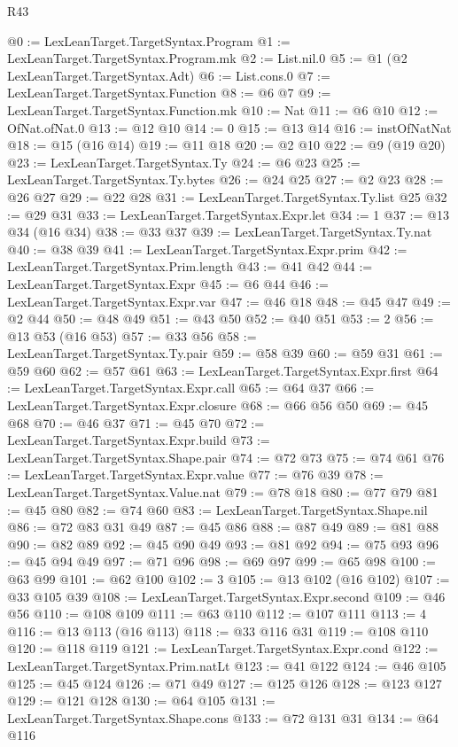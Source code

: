 \begin{lexlean}{R43}
\begin{coremodule}
@0 := LexLeanTarget.TargetSyntax.Program
@1 := LexLeanTarget.TargetSyntax.Program.mk
@2 := List.nil.{0}
@5 := @1 (@2 LexLeanTarget.TargetSyntax.Adt)
@6 := List.cons.{0}
@7 := LexLeanTarget.TargetSyntax.Function
@8 := @6 @7
@9 := LexLeanTarget.TargetSyntax.Function.mk
@10 := Nat
@11 := @6 @10
@12 := OfNat.ofNat.{0}
@13 := @12 @10
@14 := 0
@15 := @13 @14
@16 := instOfNatNat
@18 := @15 (@16 @14)
@19 := @11 @18
@20 := @2 @10
@22 := @9 (@19 @20)
@23 := LexLeanTarget.TargetSyntax.Ty
@24 := @6 @23
@25 := LexLeanTarget.TargetSyntax.Ty.bytes
@26 := @24 @25
@27 := @2 @23
@28 := @26 @27
@29 := @22 @28
@31 := LexLeanTarget.TargetSyntax.Ty.list @25
@32 := @29 @31
@33 := LexLeanTarget.TargetSyntax.Expr.let
@34 := 1
@37 := @13 @34 (@16 @34)
@38 := @33 @37
@39 := LexLeanTarget.TargetSyntax.Ty.nat
@40 := @38 @39
@41 := LexLeanTarget.TargetSyntax.Expr.prim
@42 := LexLeanTarget.TargetSyntax.Prim.length
@43 := @41 @42
@44 := LexLeanTarget.TargetSyntax.Expr
@45 := @6 @44
@46 := LexLeanTarget.TargetSyntax.Expr.var
@47 := @46 @18
@48 := @45 @47
@49 := @2 @44
@50 := @48 @49
@51 := @43 @50
@52 := @40 @51
@53 := 2
@56 := @13 @53 (@16 @53)
@57 := @33 @56
@58 := LexLeanTarget.TargetSyntax.Ty.pair
@59 := @58 @39
@60 := @59 @31
@61 := @59 @60
@62 := @57 @61
@63 := LexLeanTarget.TargetSyntax.Expr.first
@64 := LexLeanTarget.TargetSyntax.Expr.call
@65 := @64 @37
@66 := LexLeanTarget.TargetSyntax.Expr.closure
@68 := @66 @56 @50
@69 := @45 @68
@70 := @46 @37
@71 := @45 @70
@72 := LexLeanTarget.TargetSyntax.Expr.build
@73 := LexLeanTarget.TargetSyntax.Shape.pair
@74 := @72 @73
@75 := @74 @61
@76 := LexLeanTarget.TargetSyntax.Expr.value
@77 := @76 @39
@78 := LexLeanTarget.TargetSyntax.Value.nat
@79 := @78 @18
@80 := @77 @79
@81 := @45 @80
@82 := @74 @60
@83 := LexLeanTarget.TargetSyntax.Shape.nil
@86 := @72 @83 @31 @49
@87 := @45 @86
@88 := @87 @49
@89 := @81 @88
@90 := @82 @89
@92 := @45 @90 @49
@93 := @81 @92
@94 := @75 @93
@96 := @45 @94 @49
@97 := @71 @96
@98 := @69 @97
@99 := @65 @98
@100 := @63 @99
@101 := @62 @100
@102 := 3
@105 := @13 @102 (@16 @102)
@107 := @33 @105 @39
@108 := LexLeanTarget.TargetSyntax.Expr.second
@109 := @46 @56
@110 := @108 @109
@111 := @63 @110
@112 := @107 @111
@113 := 4
@116 := @13 @113 (@16 @113)
@118 := @33 @116 @31
@119 := @108 @110
@120 := @118 @119
@121 := LexLeanTarget.TargetSyntax.Expr.cond
@122 := LexLeanTarget.TargetSyntax.Prim.natLt
@123 := @41 @122
@124 := @46 @105
@125 := @45 @124
@126 := @71 @49
@127 := @125 @126
@128 := @123 @127
@129 := @121 @128
@130 := @64 @105
@131 := LexLeanTarget.TargetSyntax.Shape.cons
@133 := @72 @131 @31
@134 := @64 @116

\end{coremodule}
\end{lexlean}
